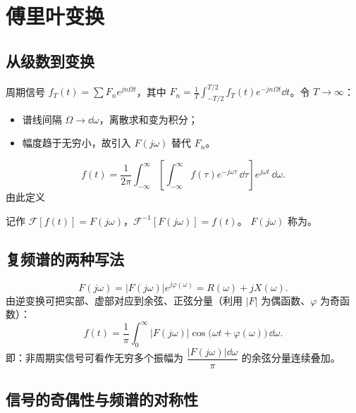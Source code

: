 \section{傅里叶变换}

\subsection{从级数到变换}

周期信号 $f_T(t)=\sum F_ne^{jn\Omega t}$，其中
$F_n=\frac{1}{T}\int_{-T/2}^{T/2}f_T(t)e^{-jn\Omega t}\dd t$。令 $T\to\infty$：

\begin{itemize}
    \item 谱线间隔 $\Omega\to\dd\omega$，离散求和变为积分；
    \item 幅度趋于无穷小，故引入 $F(j\omega)$ 替代 $F_n$。
\end{itemize}

\[
    f(t)=\frac{1}{2\pi}\int_{-\infty}^{\infty}
    \left[\int_{-\infty}^{\infty}f(\tau)e^{-j\omega\tau}\,\dd\tau\right]
    e^{j\omega t}\,\dd\omega .
\]
由此定义
\begin{keyeq}
    \qquad{}
\end{keyeq}
\begin{keyeq}
    \qquad{}
\end{keyeq}
记作 $\mathcal{F}[f(t)]=F(j\omega)$，$\mathcal{F}^{-1}[F(j\omega)]=f(t)$。
$F(j\omega)$ 称为。

\subsection{复频谱的两种写法}

\[
    F(j\omega)=|F(j\omega)|e^{j\varphi(\omega)}=R(\omega)+jX(\omega).
\]
由逆变换可把实部、虚部对应到余弦、正弦分量（利用 $|F|$ 为偶函数、$\varphi$ 为奇函数）：
\[
    f(t)=\frac{1}{\pi}\int_0^{\infty}|F(j\omega)|\cos\bigl(\omega t+\varphi(\omega)\bigr)\,\dd\omega .
\]
即：非周期实信号可看作无穷多个振幅为
$\dfrac{|F(j\omega)|\dd\omega}{\pi}$ 的余弦分量连续叠加。

\subsection{信号的奇偶性与频谱的对称性}

